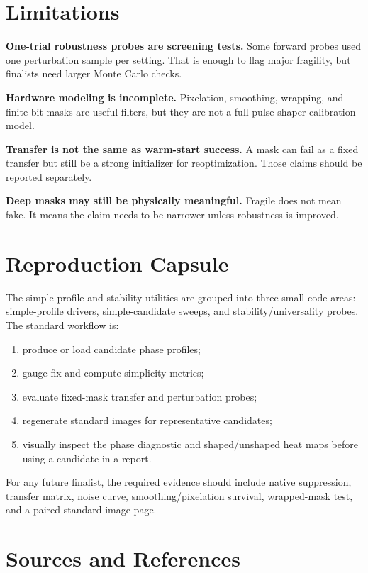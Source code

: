 \documentclass[11pt]{article}
\begin{document}
\section{Limitations}

\textbf{One-trial robustness probes are screening tests.} Some forward probes
used one perturbation sample per setting. That is enough to flag major
fragility, but finalists need larger Monte Carlo checks.

\textbf{Hardware modeling is incomplete.} Pixelation, smoothing, wrapping, and
finite-bit masks are useful filters, but they are not a full pulse-shaper
calibration model.

\textbf{Transfer is not the same as warm-start success.} A mask can fail as a
fixed transfer but still be a strong initializer for reoptimization. Those
claims should be reported separately.

\textbf{Deep masks may still be physically meaningful.} Fragile does not mean
fake. It means the claim needs to be narrower unless robustness is improved.

\section{Reproduction Capsule}

The simple-profile and stability utilities are grouped into three small code
areas: simple-profile drivers, simple-candidate sweeps, and
stability/universality probes. The standard workflow is:
\begin{enumerate}
    \item produce or load candidate phase profiles;
    \item gauge-fix and compute simplicity metrics;
    \item evaluate fixed-mask transfer and perturbation probes;
    \item regenerate standard images for representative candidates;
    \item visually inspect the phase diagnostic and shaped/unshaped heat maps
    before using a candidate in a report.
\end{enumerate}

For any future finalist, the required evidence should include native
suppression, transfer matrix, noise curve, smoothing/pixelation survival,
wrapped-mask test, and a paired standard image page.

\section{Sources and References}
\end{document}
